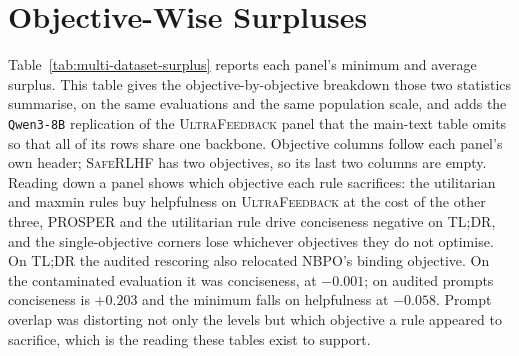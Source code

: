 \documentclass{article}
\theoremstyle{remark}
\theoremstyle{plain}
\newcommand{\NBPO}{\textsc{NBPO}}
\begin{document}
\section{Objective-Wise Surpluses}
\label{app:objectivewise}
Table~\ref{tab:multi-dataset-surplus} reports each panel's minimum and average surplus. This table gives
the objective-by-objective breakdown those two statistics summarise, on the same evaluations and the same
population scale, and adds the \texttt{Qwen3-8B} replication of the \textsc{UltraFeedback} panel that the
main-text table omits so that all of its rows share one backbone. Objective columns follow each panel's own
header; \textsc{SafeRLHF} has two objectives, so its last two columns are empty. Reading down a panel shows
which objective each rule sacrifices: the utilitarian and maxmin rules buy helpfulness on
\textsc{UltraFeedback} at the cost of the other three, PROSPER and the utilitarian rule drive conciseness
negative on \textsc{TL;DR}, and the single-objective corners lose whichever objectives they do not
optimise. On \textsc{TL;DR} the audited rescoring also relocated \NBPO{}'s binding objective. On the
contaminated evaluation it was conciseness, at $-0.001$; on audited prompts conciseness is $+0.203$ and
the minimum falls on helpfulness at $-0.058$. Prompt overlap was distorting not only the levels but which
objective a rule appeared to sacrifice, which is the reading these tables exist to support.
\end{document}
